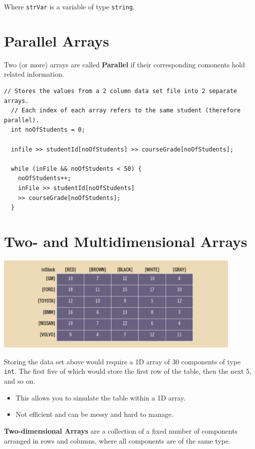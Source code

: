 \documentclass{article}
\begin{document}
Where \texttt{strVar} is a variable of type \texttt{string}.


\section{Parallel Arrays}
Two (or more) arrays are called \textbf{Parallel} if their corresponding
comonents hold related information.


\begin{lstlisting}[caption={Parallel Array Example}]
  // Stores the values from a 2 column data set file into 2 separate arrays.
  // Each index of each array refers to the same student (therefore parallel).
  int noOfStudents = 0;

  infile >> studentId[noOfStudents] >> courseGrade[noOfStudents];

  while (inFile && noOfStudents < 50) {
    noOfStudents++;
    inFile >> studentId[noOfStudents]
    >> courseGrade[noOfStudents];
  }
\end{lstlisting}

\section{Two- and Multidimensional Arrays}

\begin{center}
    \includegraphics[width=0.9\textwidth]{nD-arr-data-ex.png}
\end{center}

Storing the data set above would require a 1D array of 30 components of type
\texttt{int}. The first five of which would store the first row of the table,
then the next 5, and so on.
\begin{itemize}
  \item This allows you to simulate the table within a 1D array.
  \item Not efficient and can be messy and hard to manage.
\end{itemize}

\textbf{Two-dimensional Arrays} are a collection of a fixed number of components
arranged in rows and columns, where all components are of the same type.
\end{document}

